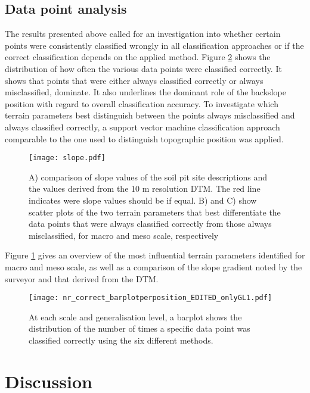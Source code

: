 \documentclass[preprint,12pt,authoryear]{elsarticle}
\begin{document}
\subsection{Data point analysis} 
The results presented above called for an investigation into whether certain points were consistently classified wrongly in all classification approaches or if the correct classification depends on the applied method. Figure \ref{fig:hist_correct_per_tp} shows the distribution of how often the various data points were classified correctly. It shows that points that were either always classified correctly or always misclassified, dominate. It also underlines the dominant role of the backslope position with regard to overall classification accuracy. To investigate which terrain parameters best distinguish between the points always misclassified and always classified correctly, a support vector machine classification approach comparable to the one used to distinguish topographic position was applied.
\begin{figure}
\texttt{[image: slope.pdf]}
\caption{A) comparison of slope values of the soil pit site descriptions and the  values derived from the 10 m resolution DTM. The red line indicates were slope values should be if equal. B) and C) show scatter plots of the two terrain parameters that best differentiate the data points that were always classified correctly from those always misclassified, for macro and meso scale, respectively}
\label{fig:slope}
\end{figure}
 Figure \ref{fig:slope} gives an overview of the most influential terrain parameters identified for macro and meso scale, as well as a comparison of the slope gradient noted by the surveyor and that derived from the DTM. 

\begin{figure}
\texttt{[image: nr\_correct\_barplotperposition\_EDITED\_onlyGL1.pdf]}
\caption{At each scale and generalisation level, a barplot shows the distribution of the number of times a specific data point was classified correctly using the six different methods.}
\label{fig:hist_correct_per_tp}
\end{figure}


\section{Discussion}
\end{document}
